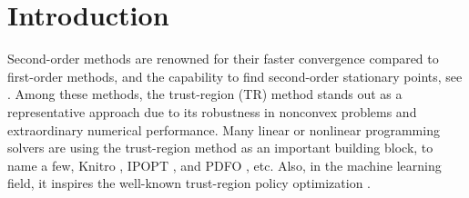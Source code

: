 





\section{Introduction}\label{sec:Intro}
Second-order methods are renowned for their faster convergence compared to first-order methods, and the capability to find second-order stationary points, see \cite{cartis2022evaluation,nocedal1999numerical,nesterov_lectures_2018,carmon_lower_2020,carmon2021lower}. Among these methods, the trust-region (TR) method \cite{conn2000trust,yuan2015recent,yuan2000review,sunOptimizationTheoryMethods2006} stands out as a representative approach due to its robustness in nonconvex problems and extraordinary numerical performance. Many linear or nonlinear programming solvers are using the trust-region method as an important building block, to name a few, Knitro \cite{byrd2006k}, IPOPT \cite{wachter2006implementation}, and PDFO \cite{ragonneau2024pdfo}, etc. Also, in the machine learning field, it inspires the well-known trust-region policy optimization \cite{schulman2015trust,kurutach2018model}.

